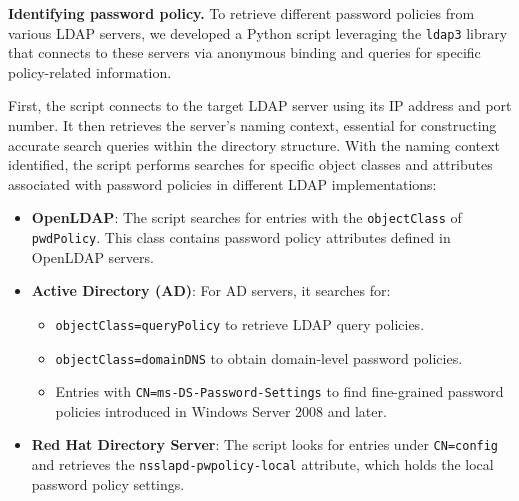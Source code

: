 




\iffalse
\textbf{Identifying password policy.} 
To retrieve different password policies from various LDAP servers, we developed a Python script leveraging the \texttt{ldap3} library that connects to these servers via anonymous binding and queries for specific policy-related information.

First, the script connects to the target LDAP server using its IP address and port number. It then retrieves the server's naming context, essential for constructing accurate search queries within the directory structure. With the naming context identified, the script performs searches for specific object classes and attributes associated with password policies in different LDAP implementations:

\begin{itemize} \item \textbf{OpenLDAP}: The script searches for entries with the \texttt{objectClass} of \texttt{pwdPolicy}. This class contains password policy attributes defined in OpenLDAP servers. \item \textbf{Active Directory (AD)}: For AD servers, it searches for: \begin{itemize} \item \texttt{objectClass=queryPolicy} to retrieve LDAP query policies. \item \texttt{objectClass=domainDNS} to obtain domain-level password policies. \item Entries with \texttt{CN=ms-DS-Password-Settings} to find fine-grained password policies introduced in Windows Server 2008 and later. \end{itemize} \item \textbf{Red Hat Directory Server}: The script looks for entries under \texttt{CN=config} and retrieves the \texttt{nsslapd-pwpolicy-local} attribute, which holds the local password policy settings. \end{itemize}

